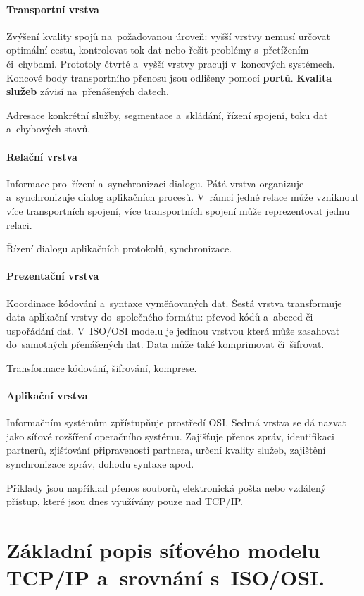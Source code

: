 \paragraph{Transportní vrstva} Zvýšení kvality spojů na~požadovanou úroveň: vyšší vrstvy nemusí určovat optimální cestu, kontrolovat tok dat nebo řešit problémy s~přetížením či~chybami. Prototoly čtvrté a~vyšší vrstvy pracují v~koncových systémech. Koncové body transportního přenosu jsou odlišeny pomocí \textbf{portů}. \textbf{Kvalita služeb} závisí na~přenášených datech.

Adresace konkrétní služby, segmentace a~skládání, řízení spojení, toku dat a~chybových stavů.

\paragraph{Relační vrstva} Informace pro~řízení a~synchronizaci dialogu. Pátá vrstva organizuje a~synchronizuje dialog aplikačních procesů. V~rámci jedné relace může vzniknout více transportních spojení, více transportních spojení může reprezentovat jednu relaci.

Řízení dialogu aplikačních protokolů, synchronizace.

\paragraph{Prezentační vrstva} Koordinace kódování a~syntaxe vyměňovaných dat. Šestá vrstva transformuje data aplikační vrstvy do~společného formátu: převod kódů a~abeced či uspořádání dat. V~ISO/OSI modelu je jedinou vrstvou která může zasahovat do~samotných přenášených dat. Data může také komprimovat či~šifrovat.

Transformace kódování, šifrování, komprese.

\paragraph{Aplikační vrstva} Informačním systémům zpřístupňuje prostředí OSI. Sedmá vrstva se dá nazvat jako síťové rozšíření operačního systému. Zajišťuje přenos zpráv, identifikaci partnerů, zjišťování připravenosti partnera, určení kvality služeb, zajištění synchronizace zpráv, dohodu syntaxe apod.

Příklady jsou například přenos souborů, elektronická pošta nebo vzdálený přístup, které jsou dnes využívány pouze nad TCP/IP.

\clearpage
\section{Základní popis síťového modelu TCP/IP a~srovnání s~ISO/OSI.}

